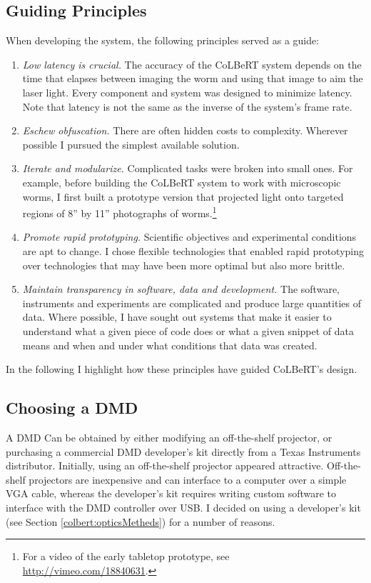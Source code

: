 \subsection{Guiding Principles} 
When developing the system, the following principles served as a guide:
\begin{enumerate}
	\item \emph{Low latency is crucial.} The accuracy of the CoLBeRT system depends on the time that elapses between imaging the worm and using that image to aim the laser light. Every component and system was designed to minimize latency.  Note that latency is not the same as the inverse of the system's frame rate. 
	\item \emph{Eschew obfuscation.} There are often hidden costs to complexity. Wherever possible I pursued the simplest available solution.  
	\item \emph{Iterate and modularize.}  Complicated tasks were broken into small ones.  For example, before building the CoLBeRT system to work with microscopic worms, I first built a prototype version that projected light onto targeted regions of 8\textonehalf'' by 11'' photographs of worms.\footnote{For a video of the early tabletop prototype, see \url{http://vimeo.com/18840631}.}  
	\item \emph{Promote rapid prototyping.} Scientific objectives and experimental conditions are apt to change. I chose flexible technologies that enabled rapid prototyping over technologies that may have been more optimal but also more brittle.
	\item \emph{Maintain transparency in software, data and development.} The software, instruments and  experiments are complicated and produce large quantities of data. Where possible, I have sought out systems that make it easier to understand what a given piece of code  does or what a given snippet of data means and when and under what conditions that data was created. 
\end{enumerate}
In the following  I highlight how these principles have guided CoLBeRT's design.

\subsection{Choosing a DMD} 
A DMD Can be obtained by either modifying an off-the-shelf projector, or purchasing a commercial DMD developer's kit directly from a Texas Instruments distributor. Initially, using an off-the-shelf projector appeared attractive. Off-the-shelf projectors are inexpensive and can interface to a computer over a simple VGA cable, whereas the developer's kit requires writing custom software to interface with the DMD controller over USB. I decided on using a developer's kit (see Section \ref{colbert:opticsMetheds}) for a number of reasons. 

